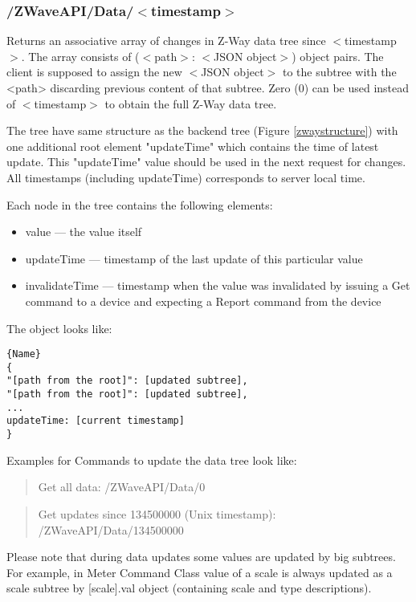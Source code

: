 \subsubsection{/ZWaveAPI/Data/$<$timestamp$>$}
Returns an associative array of changes in Z-Way data tree since $<$timestamp$>$. The array consists 
of ($<$path$>$: $<$JSON object$>$) object pairs. The client is supposed to assign the new $<$JSON object$>$ to 
the subtree with the <path> discarding previous content of that subtree. Zero (0) can be used instead 
of $<$timestamp$>$ to obtain the full Z-Way data tree.

The tree have same structure as the backend tree (Figure \ref{zwaystructure}) with one additional root element "updateTime" which 
contains the time of latest update. This "updateTime" value should be used in the next request for changes. 
All timestamps (including updateTime) corresponds to server local time.

Each node in the tree contains the following elements:
\begin{itemize}
\item value — the value itself
\item updateTime — timestamp of the last update of this particular value
\item invalidateTime — timestamp when the value was invalidated by issuing a Get command to a device and expecting a Report command from the device
\end{itemize}

The object looks like:
\begin{lstlisting}[caption=JSON Data Structure]{Name}
{
"[path from the root]": [updated subtree],
"[path from the root]": [updated subtree],
...
updateTime: [current timestamp]
}
\end{lstlisting}

Examples for Commands to update the data tree look like:

\begin{quote}Get all data: /ZWaveAPI/Data/0\end{quote}

\begin{quote} Get updates since 134500000 (Unix timestamp): /ZWaveAPI/Data/134500000\end{quote}

Please note that during data updates some values are updated by big subtrees. For example, in Meter Command Class value 
of a scale is always updated as a scale subtree by [scale].val object (containing scale and type descriptions).


